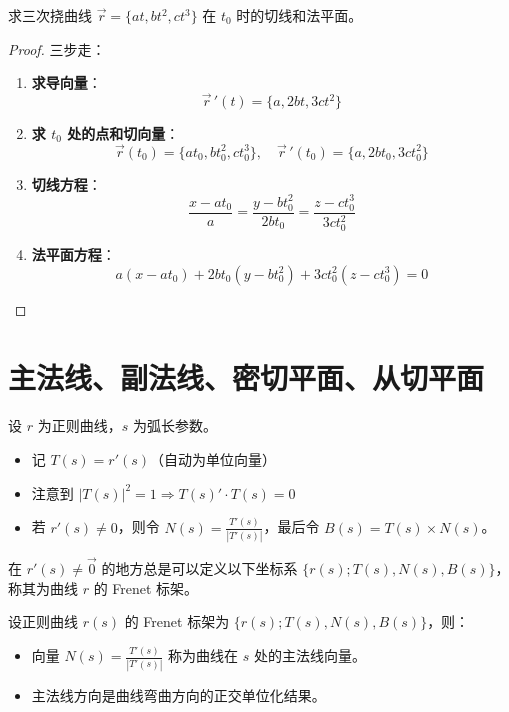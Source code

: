 \documentclass[lang=cn,10pt,thmcnt=section]{elegantbook}
\begin{document}
\begin{example}
	求三次挠曲线 $\vec{r} = \{at, bt^2, ct^3\}$ 在 $t_0$ 时的切线和法平面。
\end{example}
\begin{proof}
	三步走：
	\begin{enumerate}
		\item \textbf{求导向量}：
		\[
			\vec{r}\,'(t) = \{a, 2bt, 3ct^2\}
		\]
		
		\item \textbf{求 $t_0$ 处的点和切向量}：
		\[
			\vec{r}(t_0) = \{at_0, bt_0^2, ct_0^3\}, \quad 
			\vec{r}\,'(t_0) = \{a, 2bt_0, 3ct_0^2\}
		\]
		
		\item \textbf{切线方程}：
		\[
			\frac{x - at_0}{a} = \frac{y - bt_0^2}{2bt_0} = \frac{z - ct_0^3}{3ct_0^2}
		\]
		
		\item \textbf{法平面方程}：
		\[
			a(x - at_0) + 2bt_0(y - bt_0^2) + 3ct_0^2(z - ct_0^3) = 0
		\]
	\end{enumerate}
\end{proof}
\section{主法线、副法线、密切平面、从切平面}
\begin{definition}[Frenet 标架]
    设 $r$ 为正则曲线，$s$ 为弧长参数。
    \begin{itemize}
        \item 记 $T(s) = r'(s)$（自动为单位向量）
        \item 注意到 $|T(s)|^2 = 1 \Rightarrow T(s)' \cdot T(s) = 0$
        \item 若 $r'(s) \neq 0$，则令 $N(s) = \frac{T'(s)}{|T'(s)|}$，最后令 $B(s) = T(s) \times N(s)$。
    \end{itemize}
    在 $r'(s) \neq \vec{0}$ 的地方总是可以定义以下坐标系 $\{r(s); T(s), N(s), B(s)\}$，称其为曲线 $r$ 的 Frenet 标架。
\end{definition}
\begin{definition}[主法线]
    设正则曲线 $r(s)$ 的 Frenet 标架为 $\{r(s); T(s), N(s), B(s)\}$，则：
    \begin{itemize}
        \item 向量 $N(s) = \frac{T'(s)}{|T'(s)|}$ 称为曲线在 $s$ 处的主法线向量。
        \item 主法线方向是曲线弯曲方向的正交单位化结果。
    \end{itemize}
\end{definition}
\end{document}
